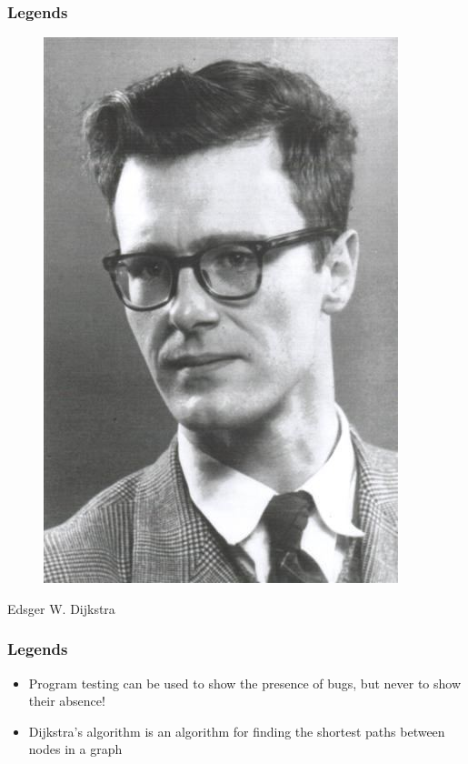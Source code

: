 \documentclass{../c-lecture}
\begin{document}
\begin{frame}
  \frametitle{Legends}
  \begin{figure}
    \includegraphics[height=.75\textheight]{./img/dijkstra.jpg}
  \end{figure}
  \pause%
  \centering
  \color{Violet} Edsger W. Dijkstra
\end{frame}

\begin{frame}
  \frametitle{Legends}
  \begin{itemize}
    \item
      Program testing can be used to show the presence of bugs, but never to
      show their absence!
    \item
      Dijkstra's algorithm is an algorithm for finding the shortest paths
      between nodes in a graph
  \end{itemize}
\end{frame}
\end{document}
